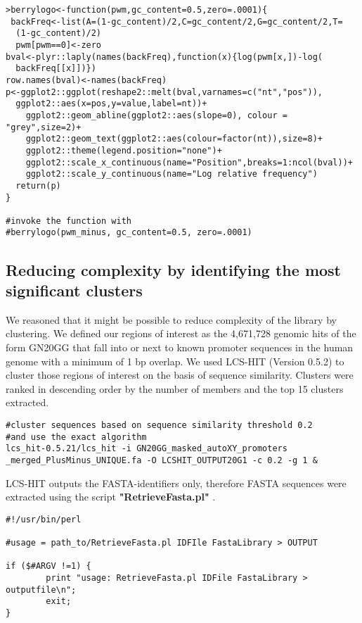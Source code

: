 \begin{footnotesize}
\begin{lstlisting}
>berrylogo<-function(pwm,gc_content=0.5,zero=.0001){
 backFreq<-list(A=(1-gc_content)/2,C=gc_content/2,G=gc_content/2,T=
  (1-gc_content)/2)
  pwm[pwm==0]<-zero
bval<-plyr::laply(names(backFreq),function(x){log(pwm[x,])-log(
  backFreq[[x]])})
row.names(bval)<-names(backFreq)
p<-ggplot2::ggplot(reshape2::melt(bval,varnames=c("nt","pos")),
  ggplot2::aes(x=pos,y=value,label=nt))+
    ggplot2::geom_abline(ggplot2::aes(slope=0), colour = "grey",size=2)+
    ggplot2::geom_text(ggplot2::aes(colour=factor(nt)),size=8)+
    ggplot2::theme(legend.position="none")+
    ggplot2::scale_x_continuous(name="Position",breaks=1:ncol(bval))+
    ggplot2::scale_y_continuous(name="Log relative frequency")
  return(p)
}

#invoke the function with
#berrylogo(pwm_minus, gc_content=0.5, zero=.0001)
\end{lstlisting}

\subsection{Reducing complexity by identifying the most significant clusters}

We reasoned that it might be possible to reduce complexity of the library by clustering. We defined our regions of interest as the 4,671,728 genomic hits of the form GN20GG that fall into or next to known promoter sequences in the human genome with a minimum of 1 bp overlap. We used LCS-HIT (Version 0.5.2)\cite{Namiki:2013bv} to cluster those regions of interest on the basis of sequence similarity. Clusters were ranked in descending order by the number of members and the top 15 clusters extracted.

\begin{lstlisting}
#cluster sequences based on sequence similarity threshold 0.2 
#and use the exact algorithm 
lcs_hit-0.5.21/lcs_hit -i GN20GG_masked_autoXY_promoters
_merged_PlusMinus_UNIQUE.fa -O LCSHIT_OUTPUT20G1 -c 0.2 -g 1 & 
\end{lstlisting}

LCS-HIT outputs the FASTA-identifiers only, therefore FASTA sequences were extracted using the script \textbf{"RetrieveFasta.pl"} \cite{Retrieve:Online}.

\begin{lstlisting}
#!/usr/bin/perl

#usage = path_to/RetrieveFasta.pl IDFIle FastaLibrary > OUTPUT

if ($#ARGV !=1) {
        print "usage: RetrieveFasta.pl IDFile FastaLibrary > outputfile\n";
        exit;
}


\end{lstlisting}
\end{footnotesize}
